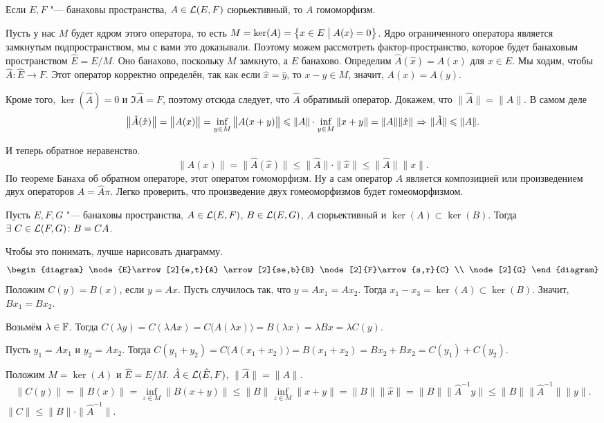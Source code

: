 \begin{The}[о гомоморфизме]
  Если $E,F$ "--- банаховы пространства, $A\in\mathcal L(E,F)$ сюрьективный, то $A$ гомоморфизм.
\end{The}
\begin{Proof}
  Пусть у нас $M$ будет ядром этого оператора, то есть $M = \ker(A) = \big\{x\in E\bigm| A(x)=0\big\}$. Ядро ограниченного оператора является замкнутым подпространством, мы с вами это доказывали. Поэтому можем рассмотреть фактор-пространство, которое будет банаховым пространством $\hat E = E/M$. Оно банахово, поскольку $M$ замкнуто, а $E$ банахово. Определим $\hat A(\hat x) = A(x)$ для $x\in E$. Мы ходим, чтобы $\hat A\colon\hat E\to F$. Этот оператор корректно определён, так как если $\hat x = \hat y$, то $x-y\in M$, значит, $A(x) = A(y)$.
 
Кроме того, $\ker(\hat A) = 0$ и $\Im\hat A=F$, поэтому отсюда следует, что $\hat A$ обратимый оператор. Докажем, что $\|\hat A\| = \|A\|$. В самом деле 
\[
  \big\|\hat A(\hat x)\big\| = \big\|A(x)\big\| = \inf\limits_{y\in M}\big\|A(x+y)\big\|\leqslant \|A\|\cdot \inf\limits_{y\in M}\|x+y\| = \| A\|\|\hat x\|\hspace{1pt plus1pt}\Rightarrow\hspace{1pt plus1pt} \|\hat A\|\leqslant \|A\|.
\]

И теперь обратное неравенство.
\[
  \big\|A(x)\big\| = \big\|\hat A(\hat x)\big\|\le \|\hat A\|\cdot\|\hat x\|\le \|\hat A\|\|x\|.
\]
По теореме Банаха об обратном операторе, этот оператом гомоморфизм. Ну а сам оператор $A$ является композицией или произведением двух операторов $A = \hat A\pi$. Легко проверить, что произведение двух гомеоморфизмов будет гомеоморфизмом.
\end{Proof}

\begin{The}[о тройке]
  Пусть $E,F,G$ "--- банаховы пространства, $A\in\mathcal L(E,F)$, $B\in \mathcal L(E,G)$, $A$ сюрьективный и $\ker (A)\subset \ker(B)$. Тогда $\exists\ C\in\mathcal L(F,G)\colon B = CA$.
\end{The}
\begin{Proof}
  Чтобы это понимать, лучше нарисовать диаграмму.
\[
\begin{diagram}
  \node{E}\arrow[2]{e,t}{A}
  	  \arrow[2]{se,b}{B}
  \node[2]{F}\arrow{s,r}{C} \\
  \node[2]{G}
\end{diagram}
\]
Положим $C(y) = B(x)$, если $y= Ax$. Пусть случилось так, что $y = Ax_1= A x_2$. Тогда $x_1-x_3 = \ker(A)\subset \ker(B)$. Значит, $B x_1 = B x_2$.

Возьмём $\lambda\in \mathbb F$. Тогда $C(\lambda y) = C(\lambda Ax) = C\big(A(\lambda x)\big) = B(\lambda x) = \lambda Bx = \lambda C(y)$.

Пусть $y_1 = A x_1$ и $y_2 = A x_2$. Тогда $C(y_1+y_2) = C\big( A(x_1+x_2)\big) = B(x_1 +x_2) = Bx_2 + Bx_2 = C(y_1) + C(y_2)$.

Положим $M = \ker(A)$ и $\hat E = E/M$.  $\hat A\in\mathcal L(\hat E,F)$, $\|\hat A\|=\|A\|$.
\[
  \big\|C(y)\big\| = \big\|B(x)\big\| = \inf\limits_{z\in M}\big\|B(x+y)\big\|\le
  \|B\|\inf\limits_{z\in M}\|x+y\| = \|B\| \|\hat x\|=
  \|B\|\|\hat A^{-1}y\|\le \|B\|\|\hat A^{-1}\|\|y\|.
\]
$\|C\|\le \|B\|\cdot \|\hat A^{-1}\|$.
\end{Proof}


